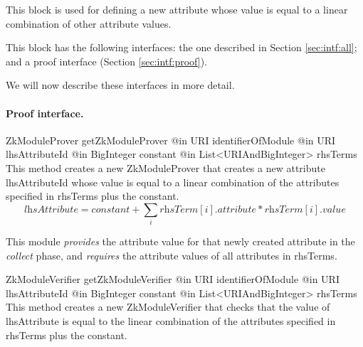     This block is used for defining a new attribute whose value is equal to
    a linear combination of other attribute values.

    This block has the following interfaces:
    the one described in Section \ref{sec:intf:all};
    and a proof interface (Section \ref{sec:intf:proof}).

    We will now describe these interfaces in more detail.

    \paragraph{Proof interface.}
      \begin{method}
      {ZkModuleProver}
      {getZkModuleProver}
      {
        {@in URI identifierOfModule}
        {@in URI lhsAttributeId}
        {@in BigInteger constant}
        {@in List<URIAndBigInteger> rhsTerms}
      }
      This method creates a new ZkModuleProver that creates a new
      attribute lhsAttributeId whose value is equal to a linear combination of the
      attributes specified in rhsTerms plus the constant.
      $$\textit{lhsAttribute} = \textit{constant} + \sum_i{\textit{rhsTerm}[i]\textit{.attribute} * \textit{rhsTerm}[i]\textit{.value}}$$

      This module \emph{provides} the attribute value for that newly created attribute in the \emph{collect} phase,
      and \emph{requires} the attribute values of all attributes in rhsTerms.

      \end{method}
      \begin{method}
      {ZkModuleVerifier}
      {getZkModuleVerifier}
      {
        {@in URI identifierOfModule}
        {@in URI lhsAttributeId}
        {@in BigInteger constant}
        {@in List<URIAndBigInteger> rhsTerms}
      }
      This method creates a new ZkModuleVerifier that checks that the value of
      lhsAttribute is equal to the linear combination of the attributes
      specified in rhsTerms plus the constant.

      \end{method}

